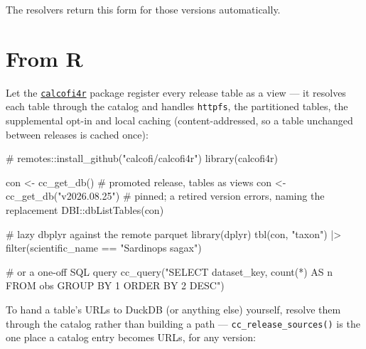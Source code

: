 \documentclass[
  letterpaper,
  DIV=11,
  numbers=noendperiod]{scrreprt}
\newenvironment{Shaded}{\begin{snugshade}}{\end{snugshade}}
\newcommand{\CommentTok}[1]{\textcolor[rgb]{0.37,0.37,0.37}{#1}}
\newcommand{\FunctionTok}[1]{\textcolor[rgb]{0.28,0.35,0.67}{#1}}
\newcommand{\NormalTok}[1]{\textcolor[rgb]{0.00,0.23,0.31}{#1}}
\newcommand{\OtherTok}[1]{\textcolor[rgb]{0.00,0.23,0.31}{#1}}
\newcommand{\SpecialCharTok}[1]{\textcolor[rgb]{0.37,0.37,0.37}{#1}}
\newcommand{\StringTok}[1]{\textcolor[rgb]{0.13,0.47,0.30}{#1}}
\begin{document}
The resolvers return this form for those versions automatically.

\section{From R}\label{from-r}

Let the \href{https://calcofi.io/calcofi4r}{\texttt{calcofi4r}} package
register every release table as a view --- it resolves each table
through the catalog and handles \texttt{httpfs}, the partitioned tables,
the supplemental opt-in and local caching (content-addressed, so a table
unchanged between releases is cached once):

\begin{Shaded}
\begin{Highlighting}[]
\CommentTok{\# remotes::install\_github("calcofi/calcofi4r")}
\FunctionTok{library}\NormalTok{(calcofi4r)}

\NormalTok{con }\OtherTok{\textless{}{-}} \FunctionTok{cc\_get\_db}\NormalTok{()                       }\CommentTok{\# promoted release, tables as views}
\NormalTok{con }\OtherTok{\textless{}{-}} \FunctionTok{cc\_get\_db}\NormalTok{(}\StringTok{"v2026.08.25"}\NormalTok{)          }\CommentTok{\# pinned; a retired version errors, naming the replacement}
\NormalTok{DBI}\SpecialCharTok{::}\FunctionTok{dbListTables}\NormalTok{(con)}

\CommentTok{\# lazy dbplyr against the remote parquet}
\FunctionTok{library}\NormalTok{(dplyr)}
\FunctionTok{tbl}\NormalTok{(con, }\StringTok{"taxon"}\NormalTok{) }\SpecialCharTok{|\textgreater{}} \FunctionTok{filter}\NormalTok{(scientific\_name }\SpecialCharTok{==} \StringTok{"Sardinops sagax"}\NormalTok{)}

\CommentTok{\# or a one{-}off SQL query}
\FunctionTok{cc\_query}\NormalTok{(}\StringTok{"SELECT dataset\_key, count(*) AS n FROM obs GROUP BY 1 ORDER BY 2 DESC"}\NormalTok{)}
\end{Highlighting}
\end{Shaded}

To hand a table's URLs to DuckDB (or anything else) yourself, resolve
them through the catalog rather than building a path ---
\texttt{cc\_release\_sources()} is the one place a catalog entry becomes
URLs, for any version:
\end{document}
